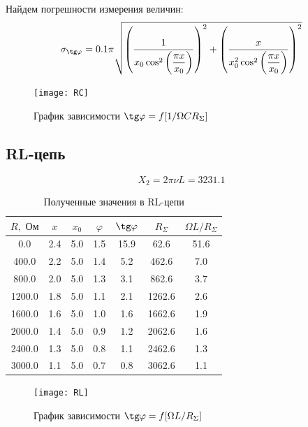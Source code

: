 \documentclass[a4paper, 12pt]{article}
\begin{document}
Найдем погрешности измерения величин:
$$\sigma_{\tg \varphi} = 
0.1\pi \sqrt{\left(\dfrac{1}{x_0 \cos^2\left(\dfrac{\pi x}{x_0}\right)}\right)^2 + \left(\dfrac{x}{x_0^2 \cos^2 \left(\dfrac{\pi x}{x_0}\right)}\right)^2} $$

	\begin {figure}[H]
		\begin{center}
			\texttt{[image: RC]}
			\caption{График зависимости $\tg \varphi = f[1/ \Omega C R_{\Sigma}]$}
		\end{center}
	\end {figure}

\subsection*{RL-цепь}
$$X_2 = 2 \pi \nu L = 3231.1$$

\begin{table}[H]
\centering
\begin{tabular}{|c|c|c|c|c|c|c|}
\hline
$R, \text{ Ом}$ & $x$ & $x_0$ & $\varphi$ & $\tg \varphi$ & $R_{\Sigma}$ & $\Omega L/ R_{\Sigma} $ \\ \hline
0.0             & 2.4 & 5.0   & 1.5   & 15.9       & 62.6      & 51.6                  \\ \hline
400.0           & 2.2 & 5.0   & 1.4   & 5.2        & 462.6     & 7.0                   \\ \hline
800.0           & 2.0 & 5.0   & 1.3   & 3.1        & 862.6     & 3.7                   \\ \hline
1200.0          & 1.8 & 5.0   & 1.1   & 2.1        & 1262.6    & 2.6                   \\ \hline
1600.0          & 1.6 & 5.0   & 1.0   & 1.6        & 1662.6    & 1.9                   \\ \hline
2000.0          & 1.4 & 5.0   & 0.9   & 1.2        & 2062.6    & 1.6                   \\ \hline
2400.0          & 1.3 & 5.0   & 0.8   & 1.1        & 2462.6    & 1.3                   \\ \hline
3000.0          & 1.1 & 5.0   & 0.7   & 0.8        & 3062.6    & 1.1                   \\ \hline
\end{tabular}
\caption{Полученные значения в RL-цепи}
\end{table}

\begin {figure}[H]
	\begin{center}
		\texttt{[image: RL]}
		\caption{График зависимости $\tg \varphi = f[\Omega L / R_{\Sigma}]$}
	\end{center}
\end {figure}
\end{document}
